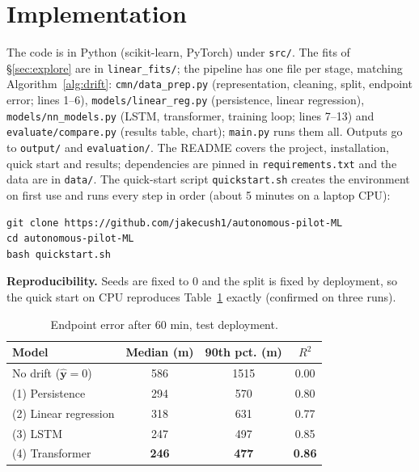 \documentclass[sigconf]{acmart}
\begin{document}
\section{Implementation}\label{sec:impl}
The code is in Python (scikit-learn, PyTorch) under \texttt{src/}. The fits of \S\ref{sec:explore} are in \texttt{linear\_fits/}; the pipeline has one file per stage, matching Algorithm~\ref{alg:drift}: \texttt{cmn/data\_prep.py} (representation, cleaning, split, endpoint error; lines 1--6), \texttt{models/linear\_reg.py} (persistence, linear regression), \texttt{models/nn\_models.py} (LSTM, transformer, training loop; lines 7--13) and \texttt{evaluate/compare.py} (results table, chart); \texttt{main.py} runs them all. Outputs go to \texttt{output/} and \texttt{evaluation/}. The README covers the project, installation, quick start and results; dependencies are pinned in \texttt{requirements.txt} and the data are in \texttt{data/}. The quick-start script \texttt{quickstart.sh} creates the environment on first use and runs every step in order (about 5 minutes on a laptop CPU):
{\footnotesize
\begin{verbatim}
git clone https://github.com/jakecush1/autonomous-pilot-ML
cd autonomous-pilot-ML
bash quickstart.sh
\end{verbatim}}
\textbf{Reproducibility.} Seeds are fixed to 0 and the split is fixed by deployment, so the quick start on CPU reproduces Table~\ref{tab:results} exactly (confirmed on three runs).

\begin{table}[t]
\caption{Endpoint error after 60 min, test deployment.}
\label{tab:results}
\footnotesize
\begin{tabular}{@{}lccc@{}}
\toprule
Model & Median (m) & 90th pct. (m) & $R^2$ \\
\midrule
No drift ($\hat{\mathbf{y}}=0$) & 586 & 1515 & 0.00 \\
(1) Persistence & 294 & 570 & 0.80 \\
(2) Linear regression & 318 & 631 & 0.77 \\
(3) LSTM & 247 & 497 & 0.85 \\
(4) Transformer & \textbf{246} & \textbf{477} & \textbf{0.86} \\
\bottomrule
\end{tabular}
\end{table}
\end{document}
